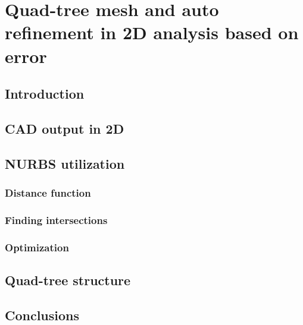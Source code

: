 
\chapter{Quad-tree mesh and auto refinement in 2D analysis based on error}

\section{Introduction}

\section{CAD output in 2D}

\section{NURBS utilization}

    \subsection{Distance function}

    \subsection{Finding intersections}

    \subsection{Optimization}

\section{Quad-tree structure}

\section{Conclusions}